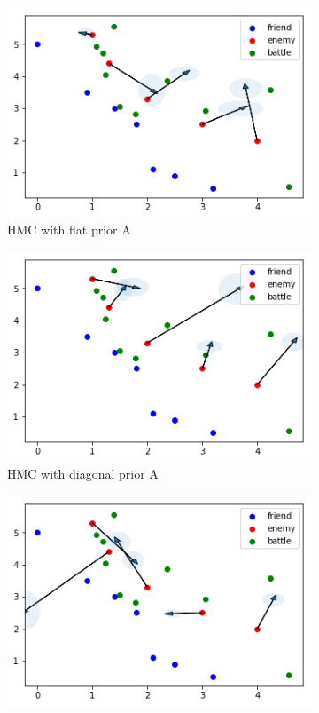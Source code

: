 \documentclass{article}
\begin{document}
\begin{figure}[h!]
  \begin{subfigure}[b]{0.45\linewidth}
    \includegraphics[width=\linewidth]{Sampling11.png}
    \caption{HMC with flat prior A}
  \end{subfigure}
  \begin{subfigure}[b]{0.45\linewidth}
    \includegraphics[width=\linewidth]{Sampling12.png}
    \caption{HMC with diagonal prior A}
  \end{subfigure}
  \begin{subfigure}[b]{0.45\linewidth}
    \includegraphics[width=\linewidth]{Sampling21.png}

\end{subfigure}
\end{figure}
\end{document}
